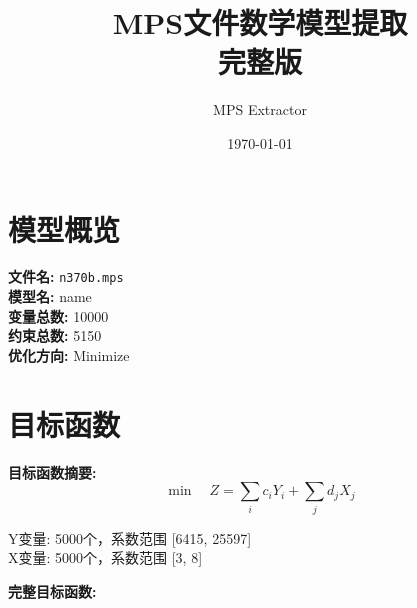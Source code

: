 \documentclass[a4paper,10pt]{article}
\title{MPS文件数学模型提取\\{\large 完整版}}
\author{MPS Extractor}
\date{\today}
\begin{document}
\maketitle
\tableofcontents
\newpage

\section{模型概览}

\textbf{文件名:} \texttt{n370b.mps} \\
\textbf{模型名:} name \\
\textbf{变量总数:} 10000 \\
\textbf{约束总数:} 5150 \\
\textbf{优化方向:} Minimize \\

\section{目标函数}

\textbf{目标函数摘要:}
\begin{equation}
\min \quad Z = \sum_{i} c_i Y_i + \sum_{j} d_j X_j
\end{equation}

Y变量: 5000个，系数范围 [6415, 25597] \\
X变量: 5000个，系数范围 [3, 8]

\textbf{完整目标函数:}
\end{document}
